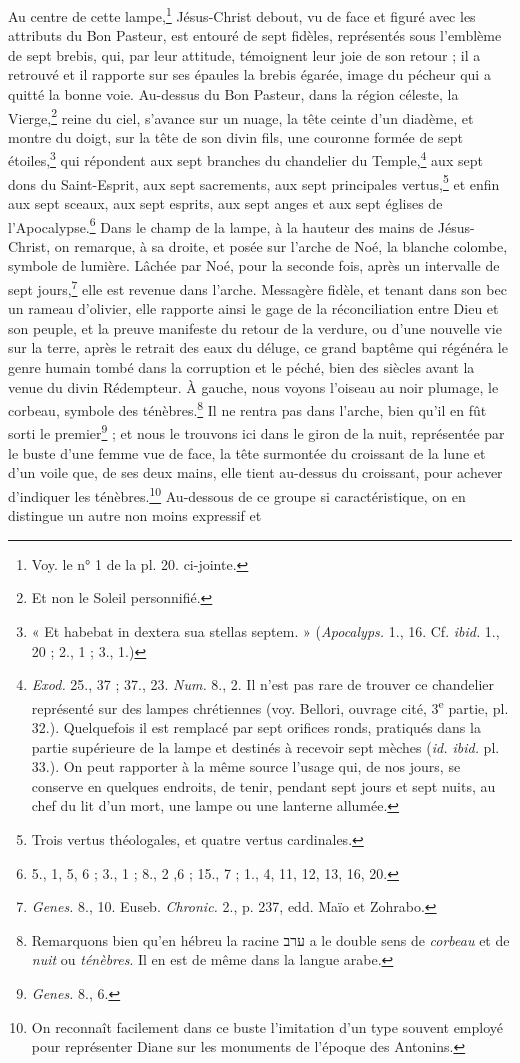 \documentclass{article}
\begin{document}
Au centre de cette lampe,\footnote{Voy. le n° 1 de la pl. 20. ci-jointe.} Jésus-Christ debout, vu de face et figuré avec les attributs du Bon Pasteur, est entouré de sept fidèles, représentés sous l'emblème de sept brebis, qui, par leur attitude, témoignent leur joie de son retour ; il a retrouvé et il rapporte sur ses épaules la brebis égarée, image du pécheur qui a quitté la bonne voie. Au-dessus du Bon Pasteur, dans la région céleste, la Vierge,\footnote{Et non le Soleil personnifié.} reine du ciel, s'avance sur un nuage, la tête ceinte d'un diadème, et montre du doigt, sur la tête de son divin fils, une couronne formée de sept étoiles,\footnote{« Et habebat in dextera sua stellas septem. » (\emph{Apocalyps.} 1., 16. Cf. \emph{ibid.} 1., 20 ; 2., 1 ; 3., 1.)} qui répondent aux sept branches du chandelier du Temple,\footnote{\emph{Exod.} 25., 37 ; 37., 23. \emph{Num.} 8., 2. Il n'est pas rare de trouver ce chandelier représenté sur des lampes chrétiennes (voy. Bellori, ouvrage cité, 3\textsuperscript{e} partie, pl. 32.). Quelquefois il est remplacé par sept orifices ronds, pratiqués dans la partie supérieure de la lampe et destinés à recevoir sept mèches (\emph{id. ibid.} pl. 33.). On peut rapporter à la même source l'usage qui, de nos jours, se conserve en quelques endroits, de tenir, pendant sept jours et sept nuits, au chef du lit d'un mort, une lampe ou une lanterne allumée.} aux sept dons du Saint-Esprit, aux sept sacrements, aux sept principales vertus,\footnote{Trois vertus théologales, et quatre vertus cardinales.} et enfin aux sept sceaux, aux sept esprits, aux sept anges et aux sept églises de l'Apocalypse.\footnote{5., 1, 5, 6 ; 3., 1 ; 8., 2 ,6 ; 15., 7 ; 1., 4, 11, 12, 13, 16, 20.} Dans le champ de la lampe, à la hauteur des mains de Jésus-Christ, on remarque, à sa droite, et posée sur l'arche de Noé, la blanche colombe, symbole de lumière. Lâchée par Noé, pour la seconde fois, après un intervalle de sept jours,\footnote{\emph{Genes.} 8., 10. Euseb. \emph{Chronic.} 2., p. 237, edd. Maïo et Zohrabo.} elle est revenue dans l'arche. Messagère fidèle, et tenant dans son bec un rameau d'olivier, elle rapporte ainsi le gage de la réconciliation entre Dieu et son peuple, et la preuve manifeste du retour de la verdure, ou d'une nouvelle vie sur la terre, après le retrait des eaux du déluge, ce grand baptême qui régénéra le genre humain tombé dans la corruption et le péché, bien des siècles avant la venue du divin Rédempteur. À gauche, nous voyons l'oiseau au noir plumage, le corbeau, symbole des ténèbres.\footnote{Remarquons bien qu'en hébreu la racine \texthebrew{ערב} a le double sens de \emph{corbeau} et de \emph{nuit} ou \emph{ténèbres}. Il en est de même dans la langue arabe.} Il ne rentra pas dans l'arche, bien qu'il en fût sorti le premier\footnote{\emph{Genes.} 8., 6.} ; et nous le trouvons ici dans le giron de la nuit, représentée par le buste d'une femme vue de face, la tête surmontée du croissant de la lune et d'un voile que, de ses deux mains, elle tient au-dessus du croissant, pour achever d'indiquer les ténèbres.\footnote{On reconnaît facilement dans ce buste l'imitation d'un type souvent employé pour représenter Diane sur les monuments de l'époque des Antonins.} Au-dessous de ce groupe si caractéristique, on en distingue un autre non moins expressif et 
\end{document}
